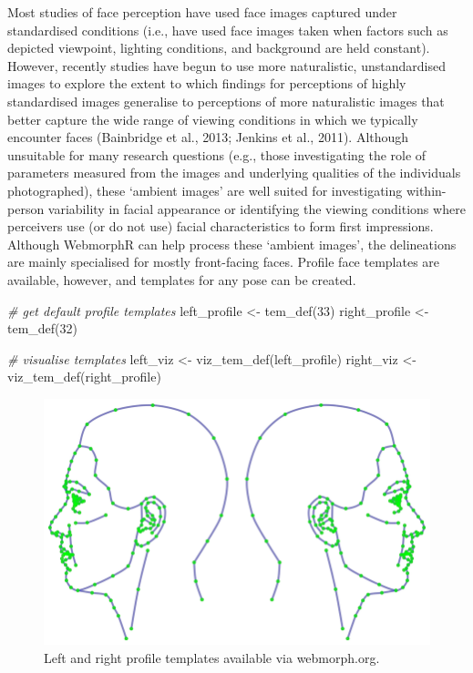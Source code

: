 \documentclass[
  man,floatsintext]{apa6}
\newenvironment{Shaded}{\begin{snugshade}}{\end{snugshade}}
\newcommand{\CommentTok}[1]{\textcolor[rgb]{0.56,0.35,0.01}{\textit{#1}}}
\newcommand{\DecValTok}[1]{\textcolor[rgb]{0.00,0.00,0.81}{#1}}
\newcommand{\FunctionTok}[1]{\textcolor[rgb]{0.00,0.00,0.00}{#1}}
\newcommand{\NormalTok}[1]{#1}
\newcommand{\OtherTok}[1]{\textcolor[rgb]{0.56,0.35,0.01}{#1}}
\begin{document}
Most studies of face perception have used face images captured under standardised conditions (i.e., have used face images taken when factors such as depicted viewpoint, lighting conditions, and background are held constant). However, recently studies have begun to use more naturalistic, unstandardised images to explore the extent to which findings for perceptions of highly standardised images generalise to perceptions of more naturalistic images that better capture the wide range of viewing conditions in which we typically encounter faces (Bainbridge et al., 2013; Jenkins et al., 2011). Although unsuitable for many research questions (e.g., those investigating the role of parameters measured from the images and underlying qualities of the individuals photographed), these `ambient images' are well suited for investigating within-person variability in facial appearance or identifying the viewing conditions where perceivers use (or do not use) facial characteristics to form first impressions. Although WebmorphR can help process these `ambient images', the delineations are mainly specialised for mostly front-facing faces. Profile face templates are available, however, and templates for any pose can be created.

\begin{Shaded}
\begin{Highlighting}[]
\CommentTok{\# get default profile templates}
\NormalTok{left\_profile }\OtherTok{\textless{}{-}} \FunctionTok{tem\_def}\NormalTok{(}\DecValTok{33}\NormalTok{)}
\NormalTok{right\_profile }\OtherTok{\textless{}{-}} \FunctionTok{tem\_def}\NormalTok{(}\DecValTok{32}\NormalTok{)}

\CommentTok{\# visualise templates}
\NormalTok{left\_viz }\OtherTok{\textless{}{-}} \FunctionTok{viz\_tem\_def}\NormalTok{(left\_profile)}
\NormalTok{right\_viz }\OtherTok{\textless{}{-}} \FunctionTok{viz\_tem\_def}\NormalTok{(right\_profile)}
\end{Highlighting}
\end{Shaded}

\begin{figure}
\includegraphics[width=1\linewidth]{index_files/figure-latex/unnamed-chunk-24-1} \caption{Left and right profile templates available via webmorph.org.}\label{fig:unnamed-chunk-24}
\end{figure}
\end{document}
